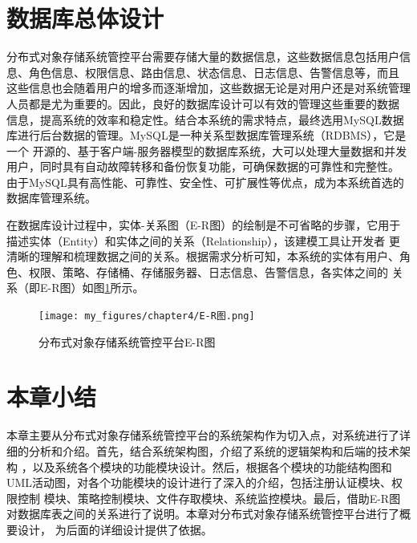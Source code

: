 \section{数据库总体设计}

分布式对象存储系统管控平台需要存储大量的数据信息，这些数据信息包括用户信息、角色信息、权限信息、路由信息、状态信息、日志信息、告警信息等，而且
这些信息也会随着用户的增多而逐渐增加，这些数据无论是对用户还是对系统管理人员都是尤为重要的。因此，良好的数据库设计可以有效的管理这些重要的数据
信息，提高系统的效率和稳定性。结合本系统的需求特点，最终选用MySQL数据库进行后台数据的管理。MySQL是一种关系型数据库管理系统（RDBMS），它是一个
开源的、基于客户端-服务器模型的数据库系统，大可以处理大量数据和并发用户，同时具有自动故障转移和备份恢复功能，可确保数据的可靠性和完整性。
由于MySQL具有高性能、可靠性、安全性、可扩展性等优点，成为本系统首选的数据库管理系统。


在数据库设计过程中，实体-关系图（E-R图）的绘制是不可省略的步骤，它用于描述实体（Entity）和实体之间的关系（Relationship），该建模工具让开发者
更清晰的理解和梳理数据之间的关系。根据需求分析可知，本系统的实体有用户、角色、权限、策略、存储桶、存储服务器、日志信息、告警信息，各实体之间的
关系（即E-R图）如图\ref{fig:E-R图}所示。

\begin{figure}[htb]
    \centering
    \texttt{[image: my\_figures/chapter4/E-R图.png]}
    \caption{分布式对象存储系统管控平台E-R图}
    \label{fig:E-R图}
\end{figure}

\section{本章小结}

本章主要从分布式对象存储系统管控平台的系统架构作为切入点，对系统进行了详细的分析和介绍。首先，结合系统架构图，介绍了系统的逻辑架构和后端的技术架构
，以及系统各个模块的功能模块设计。然后，根据各个模块的功能结构图和UML活动图，对各个功能模块的设计进行了深入的介绍，包括注册认证模块、权限控制
模块、策略控制模块、文件存取模块、系统监控模块。最后，借助E-R图对数据库表之间的关系进行了说明。本章对分布式对象存储系统管控平台进行了概要设计，
为后面的详细设计提供了依据。